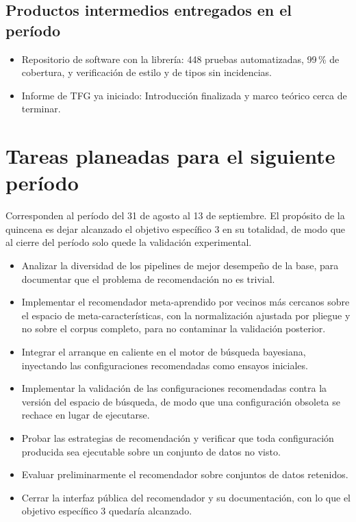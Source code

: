 \documentclass[11pt,letterpaper]{article}
\begin{document}
\subsection{Productos intermedios entregados en el período}

\begin{itemize}
  \item Repositorio de software con la librería: 448 pruebas
        automatizadas, 99\,\% de cobertura, y verificación de estilo y de tipos sin
        incidencias.
  \item Informe de TFG ya iniciado: Introducción finalizada y marco teórico cerca de terminar.

\end{itemize}

\newpage
\section{Tareas planeadas para el siguiente período}

Corresponden al período del 31 de agosto al 13 de septiembre. El propósito de la
quincena es dejar alcanzado el objetivo específico 3 en su totalidad, de modo que
al cierre del período solo quede la validación experimental.

\begin{itemize}
  \item Analizar la diversidad de los pipelines de mejor desempeño de la base, para
        documentar que el problema de recomendación no es trivial.
  \item Implementar el recomendador meta-aprendido por vecinos más cercanos sobre
        el espacio de meta-características, con la normalización ajustada por
        pliegue y no sobre el corpus completo, para no contaminar la validación
        posterior.
  \item Integrar el arranque en caliente en el motor de búsqueda bayesiana,
        inyectando las configuraciones recomendadas como ensayos iniciales.
  \item Implementar la validación de las configuraciones recomendadas contra la
        versión del espacio de búsqueda, de modo que una configuración obsoleta se
        rechace en lugar de ejecutarse.
  \item Probar las estrategias de recomendación y verificar que toda configuración
        producida sea ejecutable sobre un conjunto de datos no visto.
  \item Evaluar preliminarmente el recomendador sobre conjuntos de datos retenidos.
  \item Cerrar la interfaz pública del recomendador y su documentación, con lo que
        el objetivo específico 3 quedaría alcanzado.
\end{itemize}
\end{document}
